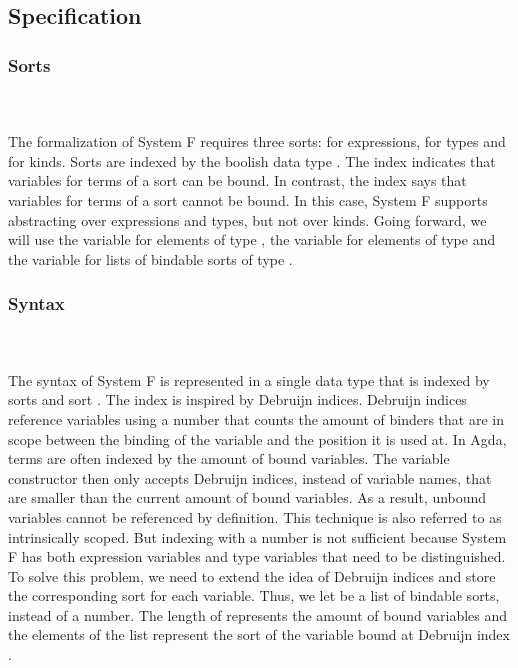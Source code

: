 \subsection{Specification}
\subsubsection{Sorts}\hfill\\\\
The formalization of System F requires three sorts:  for expressions,  for types and  for kinds. 
\FSort
Sorts are indexed by the boolish data type . 
The index  indicates that variables for terms of a sort can be bound. 
In contrast, the index  says that variables for terms of a sort cannot be bound. 
In this case, System F supports abstracting over expressions and types, but not over kinds. 
Going forward, we will use the variable  for elements of type , the variable  for elements of type  and the variable  for lists of bindable sorts of type \FSorts.

\subsubsection{Syntax}\hfill\\\\
The syntax of System F is represented in a single data type  that is indexed by sorts  and sort . 
The index  is inspired by Debruijn indices. 
Debruijn indices reference variables using a number that counts the amount of binders that are in scope between the binding of the variable and the position it is used at. 
In Agda, terms are often indexed by the amount of bound variables. 
The variable constructor then only accepts Debruijn indices, instead of variable names, that are smaller than the current amount of bound variables.
As a result, unbound variables cannot be referenced by definition. 
This technique is also referred to as intrinsically scoped.
But indexing  with a number is not sufficient because System F has both expression variables and type variables that need to be distinguished. 
To solve this problem, we need to extend the idea of Debruijn indices and store the corresponding sort for each variable. Thus, we let  be a list of bindable sorts, instead of a number.
The length of  represents the amount of bound variables and the elements  of the list represent the sort of the variable bound at Debruijn index . 

